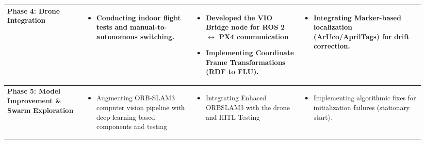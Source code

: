 \begin{table}[H]
{\begin{tabular}{|p{2cm}|p{4.3cm}|p{4.3cm}|p{4.3cm}|}
\textbf{Phase 4: Drone Integration} &
\begin{itemize}[leftmargin=*, topsep=0pt, itemsep=0pt, parsep=0pt, partopsep=0pt]
  \item Conducting indoor flight tests and manual-to-autonomous switching.
\end{itemize} &
\begin{itemize}[leftmargin=*, topsep=0pt, itemsep=0pt, parsep=0pt, partopsep=0pt]
  \item Developed the VIO Bridge node for ROS 2 $\leftrightarrow$ PX4 communication
  \item Implementing Coordinate Frame Transformations (RDF to FLU).
\end{itemize} &
\begin{itemize}[leftmargin=*, topsep=0pt, itemsep=0pt, parsep=0pt, partopsep=0pt]
  \item Integrating Marker-based localization (ArUco/AprilTags) for drift correction.
\end{itemize} \\
\hline

\textbf{Phase 5: Model Improvement \& Swarm Exploration} &
\begin{itemize}[leftmargin=*, topsep=0pt, itemsep=0pt, parsep=0pt, partopsep=0pt]
  \item Augmenting ORB-SLAM3 computer vision pipeline with deep learning based components and testing
\end{itemize} &
\begin{itemize}[leftmargin=*, topsep=0pt, itemsep=0pt, parsep=0pt, partopsep=0pt]
  \item Integrating Enhaced ORBSLAM3 with the drone and HITL Testing
\end{itemize} &
\begin{itemize}[leftmargin=*, topsep=0pt, itemsep=0pt, parsep=0pt, partopsep=0pt]
  \item Implementing algorithmic fixes for initialization failures (stationary start).
\end{itemize} \\
\hline


\end{tabular}}
\end{table}
